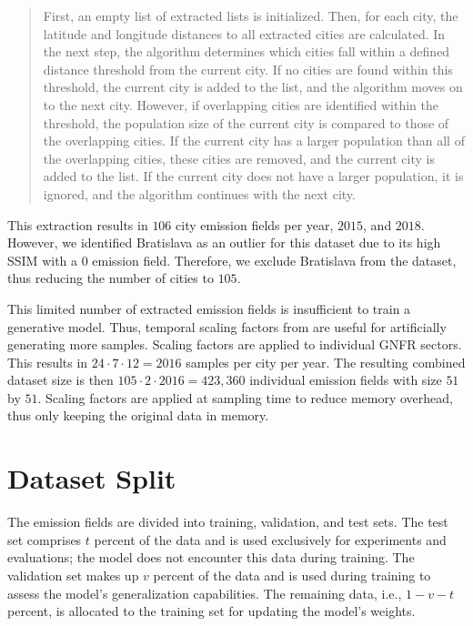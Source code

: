 \begin{quotation}
First, an empty list of extracted lists is initialized.
Then, for each city, the latitude and longitude distances to all extracted cities are calculated.
In the next step, the algorithm determines which cities fall within a defined distance threshold from the current city.
If no cities are found within this threshold, the current city is added to the list, and the algorithm moves on to the next city.
However, if overlapping cities are identified within the threshold, the population size of the current city is compared to those of the overlapping cities.
If the current city has a larger population than all of the overlapping cities, these cities are removed, and the current city is added to the list.
If the current city does not have a larger population, it is ignored, and the algorithm continues with the next city.
\end{quotation}

This extraction results in $106$ city emission fields per year, $2015$, and $2018$.
However, we identified Bratislava as an outlier for this dataset due to its high \gls{SSIM} with a $0$ emission field.
Therefore, we exclude Bratislava from the dataset, thus reducing the number of cities to $105$.

This limited number of extracted emission fields is insufficient to train a generative model.
Thus, temporal scaling factors from \parencite{ScalingFactors} are useful for artificially generating more samples.
Scaling factors are applied to individual GNFR sectors.
This results in $24 \cdot 7 \cdot 12 = 2016$ samples per city per year.
The resulting combined dataset size is then $105 \cdot 2 \cdot 2016 = 423,360$ individual emission fields with size $51$ by $51$.
Scaling factors are applied at sampling time to reduce memory overhead, thus only keeping the original data in memory.

\section{Dataset Split}
The emission fields are divided into training, validation, and test sets.
The test set comprises $t$ percent of the data and is used exclusively for experiments and evaluations; the model does not encounter this data during training.
The validation set makes up $v$ percent of the data and is used during training to assess the model's generalization capabilities.
The remaining data, i.e., $1-v-t$ percent, is allocated to the training set for updating the model's weights.

